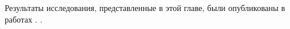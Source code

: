 \begin{enumerate}
\end{enumerate}



Результаты исследования, представленные в этой главе, были опубликованы в работах \cite{IvanovVAK2019, Ivanov2019, MukhtarovIvanovPershinDCCN2019_RSCI, Mukhtarov2020, VishnevskyMukhtarovPershinDCCN2020_RSCI, LazarevaLarionovMukhtarovITTMM2020_RSCI, VishnevskyLarionovMukhtarovICAM2020_RSCI, MukhtarovSokolovITTMM2021}.  .







